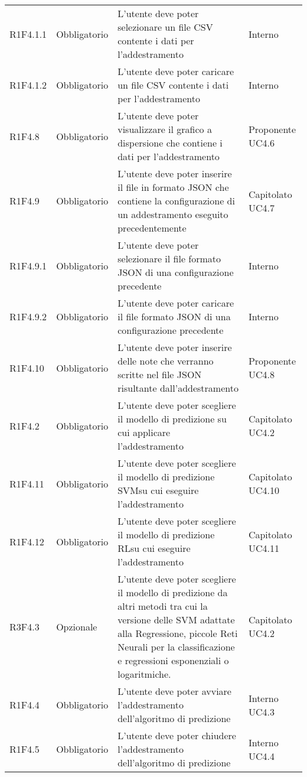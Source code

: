 \begin{longtable} {
		>{}p{24mm} 
		>{}p{32mm}
		>{}p{40mm} 
		>{}p{24.5mm}
		}
		R1F4.1.1 & Obbligatorio & L'utente deve poter selezionare un file CSV contente i dati per l'addestramento & Interno \TBstrut \\ [2mm]
		R1F4.1.2 & Obbligatorio & L'utente deve poter caricare un file CSV contente i dati per l'addestramento & Interno \TBstrut \\ [2mm]
		R1F4.8 & Obbligatorio & L'utente deve poter visualizzare il grafico a dispersione che contiene i dati per l'addestramento & Proponente UC4.6 \TBstrut \\ [2mm]
		R1F4.9 & Obbligatorio & L'utente deve poter inserire il file in formato JSON che contiene la configurazione di un addestramento eseguito precedentemente & Capitolato UC4.7 \TBstrut \\ [2mm]
		R1F4.9.1 & Obbligatorio & L'utente deve poter selezionare il file formato JSON di una configurazione precedente & Interno \TBstrut \\ [2mm]
		R1F4.9.2 & Obbligatorio & L'utente deve poter caricare il file formato JSON di una configurazione precedente & Interno \TBstrut \\ [2mm]
		R1F4.10 & Obbligatorio & L'utente deve poter inserire delle note che verranno scritte nel file JSON risultante dall'addestramento & Proponente UC4.8 \TBstrut \\ [2mm]	
		R1F4.2 & Obbligatorio & L'utente deve poter scegliere il modello di predizione su cui applicare l'addestramento & Capitolato UC4.2 \TBstrut \\ [2mm]
		R1F4.11 & Obbligatorio & L'utente deve poter scegliere il modello di predizione SVM\glosp su cui eseguire l'addestramento & Capitolato UC4.10 \TBstrut \\ [2mm]
		R1F4.12 & Obbligatorio & L'utente deve poter scegliere il modello di predizione RL\glosp su cui eseguire l'addestramento & Capitolato UC4.11 \TBstrut \\ [2mm]
		R3F4.3 & Opzionale & L'utente deve poter scegliere il modello di predizione da altri metodi tra cui la versione delle SVM adattate alla Regressione, piccole Reti Neurali per la classificazione e regressioni esponenziali o logaritmiche. & Capitolato UC4.2 \TBstrut \\ [2mm]				
		R1F4.4 & Obbligatorio & L'utente deve poter avviare l'addestramento dell'algoritmo di predizione & Interno UC4.3 \TBstrut \\ [2mm]
		R1F4.5 & Obbligatorio & L'utente deve poter chiudere l'addestramento dell'algoritmo di predizione & Interno UC4.4 \TBstrut \\ [2mm]		

\end{longtable}
